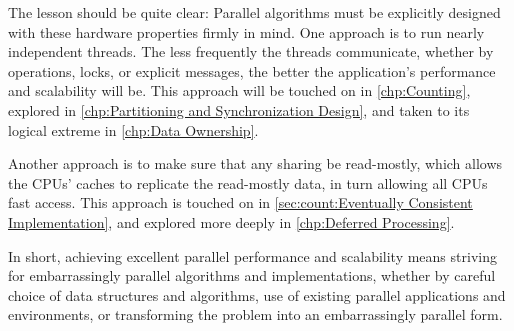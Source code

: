 The lesson should be quite clear:
Parallel algorithms must be explicitly designed with these hardware
properties firmly in mind.
One approach is to run nearly independent threads.
The less frequently the threads communicate, whether by  operations,
locks, or explicit messages, the better the application's performance
and scalability will be.
This approach will be touched on in \cref{chp:Counting},
explored in \cref{chp:Partitioning and Synchronization Design},
and taken to its logical extreme in \cref{chp:Data Ownership}.

Another approach is to make sure that any sharing be read-mostly, which
allows the CPUs' caches to replicate the read-mostly data, in turn
allowing all CPUs fast access.
This approach is touched on in
\cref{sec:count:Eventually Consistent Implementation},
and explored more deeply in \cref{chp:Deferred Processing}.

In short, achieving excellent parallel performance and scalability means
striving for embarrassingly parallel algorithms and implementations,
whether by careful choice of data structures and algorithms, use of
existing parallel applications and environments, or transforming the
problem into an embarrassingly parallel form.

\QuickQuizEnd
